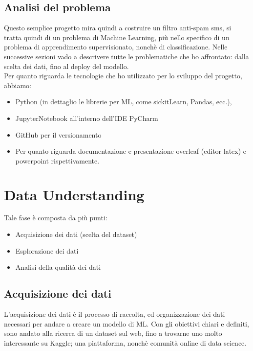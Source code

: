 \documentclass[]{article}
\begin{document}
        \newpage
        \subsection{Analisi del problema}
            Questo semplice progetto mira quindi a costruire un filtro anti-spam sms, si tratta quindi di un problema di Machine Learning, più nello specifico di un problema di apprendimento supervisionato, nonchè di classificazione. Nelle successive sezioni vado a descrivere tutte le problematiche che ho affrontato: dalla scelta dei dati, fino al deploy del modello.\\
            Per quanto riguarda le tecnologie che ho utilizzato per lo sviluppo del progetto, abbiamo:
            \begin{itemize}
                \item Python (in dettaglio le librerie per ML, come sickitLearn, Pandas,  ecc.),
                \item JupyterNotebook all'interno dell'IDE PyCharm
                \item GitHub per il versionamento
                \item Per quanto riguarda documentazione e presentazione overleaf (editor latex) e powerpoint rispettivamente.
            \end{itemize}
\newpage
\section{Data Understanding}
    Tale fase è composta da più punti:
    \begin{itemize}
        \item Acquisizione dei dati (scelta del dataset)
        \item Esplorazione dei dati
        \item Analisi della qualità dei dati
    \end{itemize}
    \subsection{Acquisizione dei dati}
        L'acquisizione dei dati è il processo di raccolta, ed organizzazione dei dati necessari per andare a creare un modello di ML. Con gli obiettivi chiari e definiti, sono andato alla ricerca di un dataset sul web, fino a trovarne uno molto interessante su Kaggle; una piattaforma, nonchè comunità online di data science. \\
\end{document}
